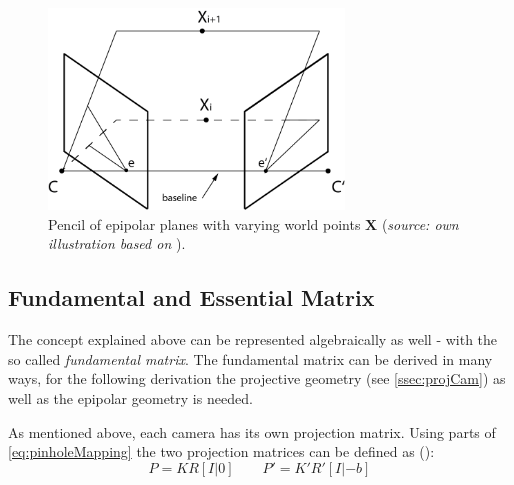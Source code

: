 \begin{figure}[htbp]
		\centering
		\includegraphics[width=0.7\textwidth]{figures/EpipolarGeometry_Planes}
		\caption[Pencil of epipolar planes with varying world points X]{Pencil of epipolar planes with varying world points $\mathbf{X}$ (\textit{source: own illustration based on} \cite[p.240]{Hartley.2011}).}
		\label{fig:EpiPlanes}
\end{figure} 

\subsection{Fundamental and Essential Matrix}
The concept explained above can be represented algebraically as well - with the so called \textit{fundamental matrix}. The fundamental matrix can be derived in many ways, for the following derivation the projective geometry (see \autoref{ssec:projCam}) as well as the epipolar geometry is needed. 


As mentioned above, each camera has its own projection matrix. Using parts of \autoref{eq:pinholeMapping} the two projection matrices can be defined as (\cite[p.309]{Luhmann.2014}):
\begin{equation}
 P=KR[I | 0]
\qquad
 P'=K'R'[I | -b]
\end{equation}

